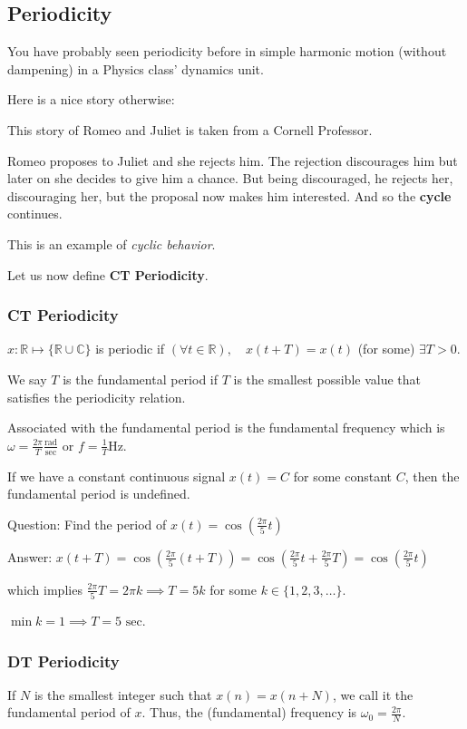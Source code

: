 \subsection{Periodicity}
You have probably seen periodicity before in simple harmonic motion (without dampening) in a Physics class' dynamics unit.

Here is a nice story otherwise:
\begin{shaded}
This story of Romeo and Juliet is taken from a Cornell Professor.

Romeo proposes to Juliet and she rejects him. The rejection discourages him but later on she decides to give him a chance. But being discouraged, he rejects her, discouraging her, but the proposal now makes him interested. And so the \textbf{cycle} continues.
\end{shaded}
This is an example of \textit{cyclic behavior}.

Let us now define \textbf{CT Periodicity}.
\subsubsection{CT Periodicity}
$x:\mathbb R\mapsto \{\mathbb R \cup \mathbb C\}$ is periodic if $(\forall t\in\mathbb R),\quad x(t+T)=x(t)$ (for some) $\exists T>0 $.

We say $T$ is the fundamental period if $T$ is the smallest possible value that satisfies the periodicity relation.

Associated with the fundamental period is the fundamental frequency which is $\omega = \frac{2\pi}T \frac{\text{rad}}{\text{sec}}$ or $f=\frac1T \text{Hz}$.

If we have a constant continuous signal $x(t)=C$ for some constant $C$, then the fundamental period is undefined.

\begin{shaded}
Question: Find the period of $x(t)=\cos\left(\frac{2\pi}5 t\right)$


Answer: 
$x(t+T)=\cos\left(\frac{2\pi}5 (t+T)\right)=\cos\left(\frac{2\pi}5 t+\frac{2\pi}5 T\right)=\cos\left(\frac{2\pi}5 t\right)$

which implies $\frac{2\pi}5 T = 2\pi k\implies T=5k$ for some $k\in\{1,2,3,\ldots\}$. 

$\min k = 1 \implies T = 5 \text{ sec}$.
\end{shaded}

\newpage
\subsubsection{DT Periodicity}
If $N$ is the smallest integer such that $x(n) = x(n+N)$, we call it the fundamental period of $x$. Thus, the (fundamental) frequency is $\omega_0=\frac{2\pi}N$.

